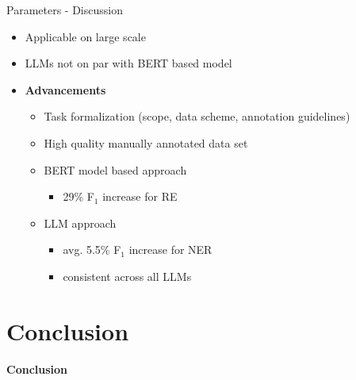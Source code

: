 \documentclass[en,16:9,smallfoot]{sdqbeamer}
\begin{document}
   \begin{frame}{Parameters - Discussion}
        \begin{itemize}
        \item Applicable on large scale
        \item LLMs not on par with BERT based model
        \item \textbf{Advancements}
            \begin{itemize}
            \item Task formalization (scope, data scheme, annotation guidelines)
            \item High quality manually annotated data set
            \item BERT model based approach
            \begin{itemize}
                \item 29\% F${}_1$ increase for RE
            \end{itemize}
            \item LLM approach
            \begin{itemize}
                \item avg. 5.5\% F${}_1$ increase for NER
                \item consistent across all LLMs
            \end{itemize}
            \end{itemize}
        \end{itemize}
   \end{frame}

\section{Conclusion}

   \begin{frame}[plain]
        \vspace{0.7cm}
        \begin{infobox-map}
        \centering
        \begin{Huge}
        \textbf{Conclusion}\\
        \end{Huge}
        \end{infobox-map}
   \end{frame}
\end{document}
